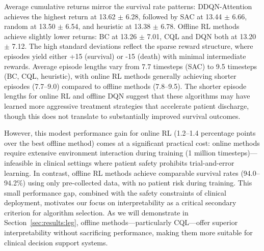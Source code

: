Average cumulative returns mirror the survival rate patterns: DDQN-Attention achieves the highest return at 13.62 $\pm$ 6.28, followed by SAC at 13.44 $\pm$ 6.66, random at 13.50 $\pm$ 6.54, and heuristic at 13.38 $\pm$ 6.78. Offline RL methods achieve slightly lower returns: BC at 13.26 $\pm$ 7.01, CQL and DQN both at 13.20 $\pm$ 7.12. The high standard deviations reflect the sparse reward structure, where episodes yield either +15 (survival) or -15 (death) with minimal intermediate rewards. Average episode lengths vary from 7.7 timesteps (SAC) to 9.5 timesteps (BC, CQL, heuristic), with online RL methods generally achieving shorter episodes (7.7--9.0) compared to offline methods (7.8--9.5). The shorter episode lengths for online RL and offline DQN suggest that these algorithms may have learned more aggressive treatment strategies that accelerate patient discharge, though this does not translate to substantially improved survival outcomes.

However, this modest performance gain for online RL (1.2--1.4 percentage points over the best offline method) comes at a significant practical cost: online methods require extensive environment interaction during training (1 million timesteps)—infeasible in clinical settings where patient safety prohibits trial-and-error learning. In contrast, offline RL methods achieve comparable survival rates (94.0--94.2\%) using only pre-collected data, with no patient risk during training. This small performance gap, combined with the safety constraints of clinical deployment, motivates our focus on interpretability as a critical secondary criterion for algorithm selection. As we will demonstrate in Section~\ref{sec:results:leg}, offline methods—particularly CQL—offer superior interpretability without sacrificing performance, making them more suitable for clinical decision support systems.

